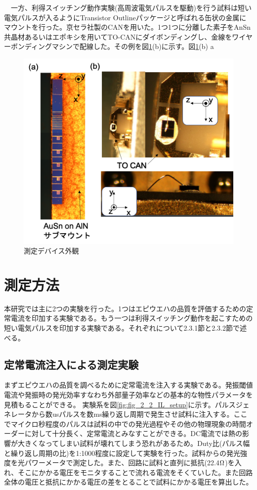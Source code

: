 　一方、利得スイッチング動作実験(高周波電気パルスを駆動)を行う試料は短い電気パルスが入るようにTransistor Outlineパッケージと呼ばれる缶状の金属にマウントを行った。京セラ社製のCANを用いた。1つ1つに分離した素子をAnSn共晶材あるいはエポキシを用いてTO-CANにダイボンディングし、金線をワイヤーボンディングマシンで配線した。その例を図\ref{fig:fig_2_1_mount}(b)に示す。図\ref{fig:fig_2_1_mount}(b)
a
\begin{figure}[h]
	\centering
	\includegraphics[width=15cm]{figure/fig_2_1_mount.png}
	\caption{測定デバイス外観}
	\label{fig:fig_2_1_mount}
\end{figure}
\clearpage
\section{測定方法}%
本研究では主に2つの実験を行った。1つはエピウエハの品質を評価するための定常電流を印加する実験である。もう一つは利得スイッチング動作を起こすための短い電気パルスを印加する実験である。それぞれについて2.3.1節と2.3.2節で述べる。
\subsection{定常電流注入による測定実験}%
まずエピウエハの品質を調べるために定常電流を注入する実験である。発振閾値電流や発振時の発光効率すなわち外部量子効率などの基本的な物性パラメータを見積もることができる。
実験系を図\ref{fig:fig_2_2_IL_setup}に示す。パルスジェネレータから数usパルスを数ms繰り返し周期で発生させ試料に注入する。ここでマイクロ秒程度のパルスは試料の中での発光過程やその他の物理現象の時間オーダーに対して十分長く、定常電流とみなすことができる。DC電流では熱の影響が大きくなってしまい試料が壊れてしまう恐れがあるため。Duty比(パルス幅と繰り返し周期の比)を1:1000程度に設定して実験を行った。試料からの発光強度を光パワーメータで測定した。また、回路に試料と直列に抵抗(22.4$\rm{\Omega}$)を入れ、そこにかかる電圧をモニタすることで流れる電流をそくていした。また回路全体の電圧と抵抗にかかる電圧の差をとることで試料にかかる電圧を算出した。

